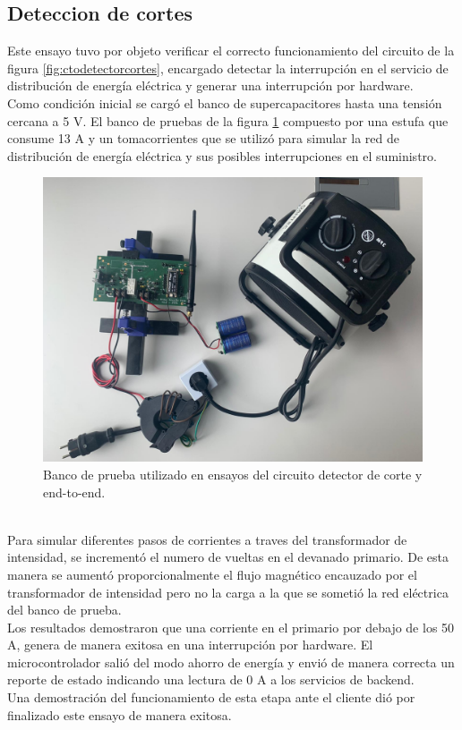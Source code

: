 \vspace{200px}
\subsection{Deteccion de cortes}
Este ensayo tuvo por objeto verificar el correcto funcionamiento del circuito de la figura \ref{fig:ctodetectorcortes}, encargado detectar la interrupci\'{o}n en el servicio de distribuci\'{o}n de energía el\'{e}ctrica y generar una interrupci\'{o}n por hardware.\\
Como condici\'{o}n inicial se carg\'{o} el banco de supercapacitores hasta una tensión cercana a 5 V. 
El banco de pruebas de la figura \ref{fig:bancopruebae2e2} compuesto por una estufa que consume 13 A y un tomacorrientes que se utiliz\'{o} para simular la red de distribuci\'{o}n de energía el\'{e}ctrica y sus posibles interrupciones en el suministro.\\
\begin{figure}[h]
	\centering
	\includegraphics[width=1.0\linewidth]{Figures/banco_prueba_e2e_1}
	\caption{Banco de prueba utilizado en ensayos del circuito detector de corte y end-to-end.}
	\label{fig:bancopruebae2e2}
\end{figure}\\
Para simular diferentes pasos de corrientes a traves del transformador de intensidad, se increment\'{o} el numero de vueltas en el devanado primario. De esta manera se aument\'{o} proporcionalmente el flujo magn\'{e}tico encauzado por el transformador de intensidad pero no la carga a la que se someti\'{o} la red el\'{e}ctrica del banco de prueba.\\
Los resultados demostraron que una corriente en el primario por debajo de los 50 A, genera de manera exitosa en una interrupci\'{o}n por hardware. El microcontrolador sali\'{o} del modo ahorro de energía y envi\'{o} de manera correcta un reporte de estado indicando una lectura de 0 A a los servicios de backend.\\
Una demostraci\'{o}n del funcionamiento de esta etapa ante el cliente dió por finalizado este ensayo de manera exitosa.\\

